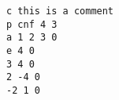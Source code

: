 \begin{lstlisting}[label=qdimacsex]
c this is a comment
p cnf 4 3
a 1 2 3 0
e 4 0
3 4 0
2 -4 0
-2 1 0
\end{lstlisting}

